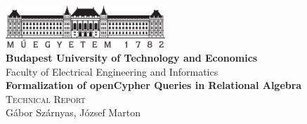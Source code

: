 \begin{titlepage}
	\begin{center}
		\includegraphics[width=60mm,keepaspectratio]{figures/bme-logo}\\
		\vspace{0.3cm}
		\textbf{Budapest University of Technology and Economics}\\
		\textmd{Faculty of Electrical Engineering and Informatics}\\[5cm]
		
		\vspace{0.4cm}
		{\huge \bfseries Formalization of openCypher Queries in Relational Algebra}\\[0.8cm]
		\vspace{0.5cm}
		\textsc{\Large Technical Report}\\[4cm]
		
		{\Large Gábor Szárnyas, József Marton}\\

		
		\vfill
			
	\end{center}		
\end{titlepage}

\addtocounter{page}{1}
